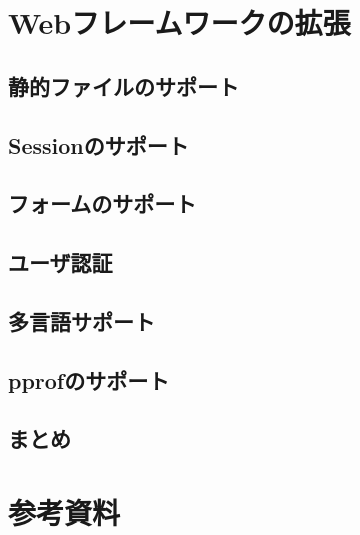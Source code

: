 \section{Webフレームワークの拡張}

\subsection{静的ファイルのサポート}

\subsection{Sessionのサポート}

\subsection{フォームのサポート}

\subsection{ユーザ認証}

\subsection{多言語サポート}

\subsection{pprofのサポート}

\subsection{まとめ}


\section{参考資料}

